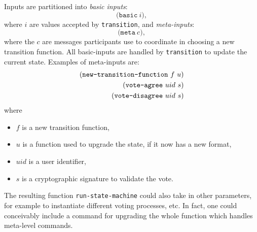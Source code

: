 Inputs are partitioned into \emph{basic inputs}:
\[
\mathtt{(basic} \ i),
\]
where $i$ are values accepted by \texttt{transition}, and \emph{meta-inputs}:
\[
\mathtt{(meta} \ c),
\]
where the $c$ are messages participants use to coordinate in choosing a new
transition function. All basic-inputs are handled by \texttt{transition}
to update the current state. Examples of meta-inputs are:
\begin{align*}
  (\text{\texttt{new-transition-function}} \ f \ u)\\
  (\text{\texttt{vote-agree}} \ uid \ s)\\
  (\text{\texttt{vote-disagree}} \ uid \ s)
\end{align*}
where
\begin{itemize}
\item $f$ is a new transition function,
\item $u$ is a function used to upgrade the state, if it now has a new format,
\item $uid$ is a user identifier,
\item $s$ is a cryptographic signature to validate the vote.
\end{itemize}
The resulting function \texttt{run-state-machine} could also take in other
parameters, for example to instantiate different voting processes, etc. In fact,
one could conceivably include a command for upgrading the whole function which
handles meta-level commands.